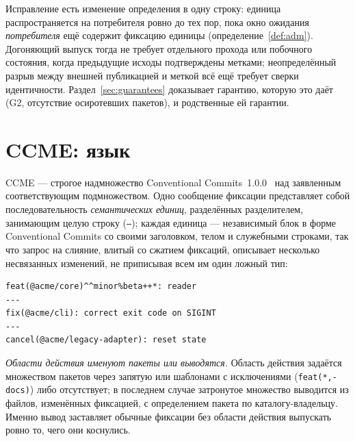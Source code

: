 \documentclass[sigconf,nonacm]{acmart}
\theoremstyle{acmplain}
\theoremstyle{acmdefinition}
\theoremstyle{acmplain}
\newcommand{\code}[1]{\texttt{#1}}
\newcommand{\G}[1]{G#1}
\begin{document}
Исправление есть изменение определения в одну строку: единица
распространяется на потребителя ровно до тех пор, пока окно ожидания
\emph{потребителя} ещё содержит фиксацию единицы
(определение~\ref{def:adm}). Догоняющий выпуск тогда не требует отдельного прохода или побочного состояния,
когда предыдущие исходы подтверждены метками; неопределённый разрыв между
внешней публикацией и меткой всё ещё требует сверки идентичности.
Раздел~\ref{sec:guarantees} доказывает гарантию, которую это даёт
(\G{2}, отсутствие осиротевших пакетов), и родственные ей гарантии.

\section{CCME: язык}
\label{sec:ccme}

CCME --- строгое надмножество Conventional Commits~1.0.0~\cite{cc} над
заявленным соответствующим подмножеством. Одно сообщение фиксации
представляет собой последовательность \emph{семантических единиц},
разделённых разделителем, занимающим целую строку (\code{---}); каждая
единица --- независимый блок в форме Conventional Commits со своими
заголовком, телом и служебными строками, так что запрос на слияние,
влитый со сжатием фиксаций, описывает несколько несвязанных изменений,
не приписывая всем им один ложный тип:

\begin{small}
\begin{verbatim}
feat(@acme/core)^^minor%beta++*: reader
---
fix(@acme/cli): correct exit code on SIGINT
---
cancel(@acme/legacy-adapter): reset state
\end{verbatim}
\end{small}

\emph{Области действия именуют пакеты или выводятся.} Область действия
задаётся множеством пакетов через запятую или шаблонами с исключениями
(\code{feat(*,-docs)}) либо отсутствует; в последнем случае затронутое
множество выводится из файлов, изменённых фиксацией, с определением
пакета по каталогу-владельцу. Именно вывод заставляет обычные фиксации
без области действия выпускать ровно то, чего они коснулись.
\end{document}
